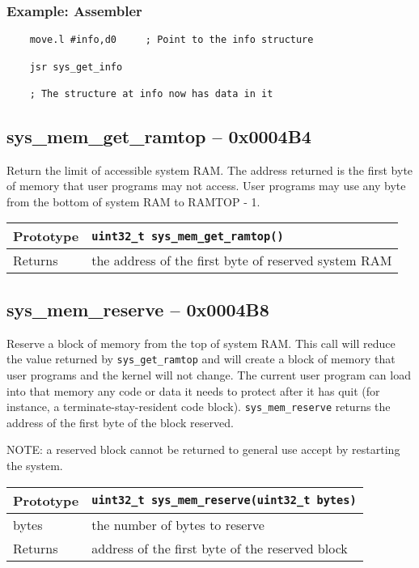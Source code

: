 \subsubsection*{Example: Assembler}
\begin{verbatim}
    move.l #info,d0		; Point to the info structure

    jsr sys_get_info

    ; The structure at info now has data in it
\end{verbatim}


\subsection*{sys\_mem\_get\_ramtop -- 0x0004B4}
Return the limit of accessible system RAM. The address returned is the first byte of memory that user programs may not access.
User programs may use any byte from the bottom of system RAM to RAMTOP - 1.

\bigskip

\begin{tabular}{|l||l|} \hline
Prototype & \lstinline!uint32_t sys_mem_get_ramtop()! \\ \hline
Returns & the address of the first byte of reserved system RAM \\ \hline
\end{tabular}


\subsection*{sys\_mem\_reserve -- 0x0004B8}
Reserve a block of memory from the top of system RAM.
This call will reduce the value returned by \lstinline|sys_get_ramtop| and will create a block of memory that user programs and the kernel will not change.
The current user program can load into that memory any code or data it needs to protect after it has quit
(for instance, a terminate-stay-resident code block). \lstinline|sys_mem_reserve| returns the address of the first byte of the block reserved.

NOTE: a reserved block cannot be returned to general use accept by restarting the system.

\bigskip

\begin{tabular}{|l||l|} \hline
Prototype & \lstinline!uint32_t sys_mem_reserve(uint32_t bytes)! \\ \hline
bytes & the number of bytes to reserve \\ \hline
Returns & address of the first byte of the reserved block \\ \hline
\end{tabular}

